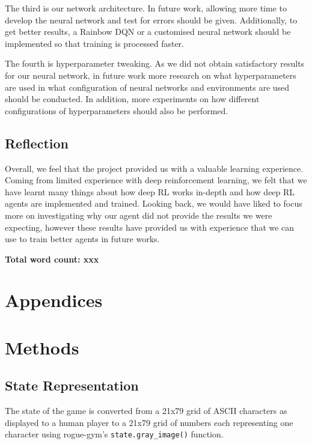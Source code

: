 \documentclass[12pt,a4paper]{article}
\begin{document}
    The third is our network architecture.
    In future work, allowing more time to develop the neural network and test for errors should be given.
    Additionally, to get better results, a Rainbow DQN or a customised neural network should be implemented so that
    training is processed faster.

    The fourth is hyperparameter tweaking.
    As we did not obtain satisfactory results for our neural network, in future work more research on what hyperparameters
    are used in what configuration of neural networks and environments are used should be conducted.
    In addition, more experiments on how different configurations of hyperparameters should also be performed.

    \subsection{Reflection}\label{subsec:reflection}
    Overall, we feel that the project provided us with a valuable learning experience.
    Coming from limited experience with deep reinforcement learning, we felt that we have learnt many things about
    how deep RL works in-depth and how deep RL agents are implemented and trained.
    Looking back, we would have liked to focus more on investigating why our agent did not provide the results we were
    expecting, however these results have provided us with experience that we can use to train better agents in future works.



    \textbf{Total word count: xxx}
    \medskip

    
    

    \medskip

    \appendix
    \section*{Appendices}
    \section{Methods}\label{sec:methods}

    \subsection{State Representation}\label{subsec:state-representation}
    The state of the game is converted from a 21x79 grid of ASCII characters as displayed to a human player to a 21x79 grid of
    numbers each representing one character using rogue-gym's \texttt{state.gray\_image()} function.
\end{document}
